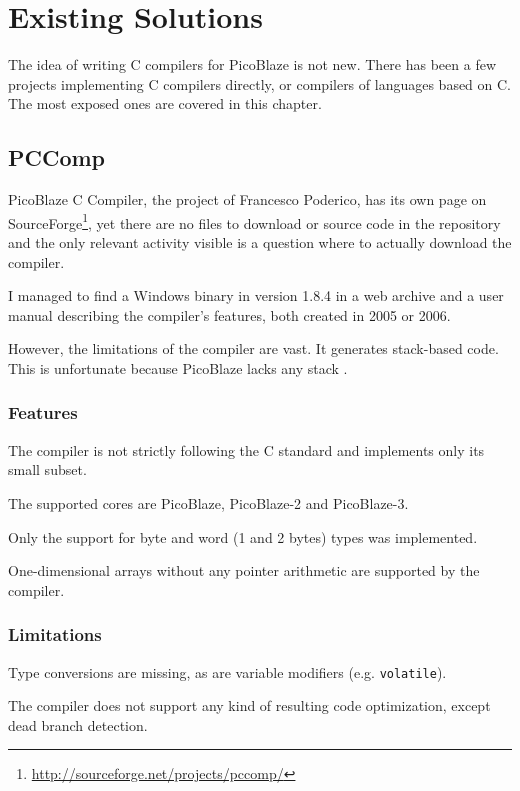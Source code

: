 \chapter{Existing Solutions}\label{existing}

The idea of writing C compilers for PicoBlaze is not new. There has been a few projects implementing C compilers directly, or compilers of languages based on C. The most exposed ones are covered in this chapter.

    \section{PCComp}\label{pccomp}

    PicoBlaze C Compiler, the project of Francesco Poderico, has its own page on SourceForge\footnote{\url{http://sourceforge.net/projects/pccomp/}},
    yet there are no files to download or source code in the repository and the only relevant activity visible is a question where to actually download the compiler.

    I managed to find a Windows binary in version 1.8.4 in a web archive and a user manual describing the compiler's features, both created in 2005 or 2006.

    However, the limitations of the compiler are vast. It generates stack-based code. This is unfortunate because PicoBlaze lacks any stack \cite{pccompman}.

        \subsection{Features}

        The compiler is not strictly following the C standard and implements only its small subset.

        The supported cores are PicoBlaze, PicoBlaze-2 and PicoBlaze-3.

        Only the support for byte and word (1 and 2 bytes) types was implemented.

        One-dimensional arrays without any pointer arithmetic are supported by the compiler.

        \subsection{Limitations}

        Type conversions are missing, as are variable modifiers (e.g. \texttt{volatile}). 

        The compiler does not support any kind of resulting code optimization, except dead branch detection.

